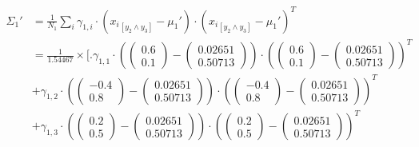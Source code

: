 \documentclass[12pt]{article}
\begin{document}
\begin{enumerate}[leftmargin=\labelsep]
          \begingroup
          \allowdisplaybreaks
          \begin{align*}
              \Sigma_1' & = \frac{1}{N_1} \sum_{i} \gamma_{1,i} \cdot \left({x_i}_{[y_2 \land y_3]} - \mu_1'\right) \cdot ({x_i}_{[y_2 \land y_3]} - \mu_1')^T \\
                        & = \frac{1}{1.54467} \times \Bigg[ \Bigg.
                            \gamma_{1,1} \cdot \left(\begin{pmatrix} 0.6 \\ 0.1 \end{pmatrix} - \begin{pmatrix} 0.02651 \\ 0.50713 \end{pmatrix}\right) \cdot \left(\begin{pmatrix} 0.6 \\ 0.1 \end{pmatrix} - \begin{pmatrix} 0.02651 \\ 0.50713 \end{pmatrix}\right)^T \\
                        & + \gamma_{1,2} \cdot \left(\begin{pmatrix} -0.4 \\ 0.8 \end{pmatrix} - \begin{pmatrix} 0.02651 \\ 0.50713 \end{pmatrix}\right) \cdot \left(\begin{pmatrix} -0.4 \\ 0.8 \end{pmatrix} - \begin{pmatrix} 0.02651 \\ 0.50713 \end{pmatrix}\right)^T \\
                        & + \gamma_{1,3} \cdot \left(\begin{pmatrix} 0.2 \\ 0.5 \end{pmatrix} - \begin{pmatrix} 0.02651 \\ 0.50713 \end{pmatrix}\right) \cdot \left(\begin{pmatrix} 0.2 \\ 0.5 \end{pmatrix} - \begin{pmatrix} 0.02651 \\ 0.50713 \end{pmatrix}\right)^T \\

\end{align*}
\end{enumerate}
\end{document}

